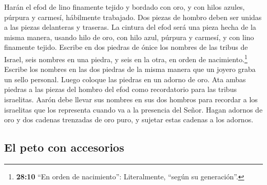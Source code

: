  Harán el efod de lino finamente tejido y bordado con oro,
y con hilos azules, púrpura y carmesí, hábilmente trabajado.
 Dos piezas de hombro deben ser unidas a las piezas
delanteras y traseras.  La cintura del efod será una pieza
hecha de la misma manera, usando hilo de oro, con hilo azul, púrpura y
carmesí, y con lino finamente tejido.  Escribe en dos
piedras de ónice los nombres de las tribus de Israel, 
seis nombres en una piedra, y seis en la otra, en orden de
nacimiento.\footnote{\textbf{28:10} ``En orden de nacimiento'':
  Literalmente, ``según su generación''.}  Escribe los
nombres en las dos piedras de la misma manera que un joyero graba un
sello personal. Luego coloque las piedras en un adorno de oro.
 Ata ambas piedras a las piezas del hombro del efod como
recordatorio para las tribus israelitas. Aarón debe llevar sus nombres
en sus dos hombros para recordar a los israelitas que los representa
cuando va a la presencia del Señor.  Hagan adornos de oro
 y dos cadenas trenzadas de oro puro, y sujetar estas
cadenas a los adornos.

\hypertarget{el-peto-con-accesorios}{%
\subsection{El peto con accesorios}\label{el-peto-con-accesorios}}

